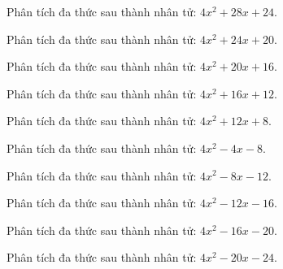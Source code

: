 \begin{bt}
	Phân tích đa thức sau thành nhân tử: $4 x^2 + 28 x + 24$.
\end{bt}
\begin{bt}
	Phân tích đa thức sau thành nhân tử: $4 x^2 + 24 x + 20$.
\end{bt}
\begin{bt}
	Phân tích đa thức sau thành nhân tử: $4 x^2 + 20 x + 16$.
\end{bt}
\begin{bt}
	Phân tích đa thức sau thành nhân tử: $4 x^2 + 16 x + 12$.
\end{bt}
\begin{bt}
	Phân tích đa thức sau thành nhân tử: $4 x^2 + 12 x + 8$.
\end{bt}
\begin{bt}
	Phân tích đa thức sau thành nhân tử: $4 x^2 - 4 x - 8$.
\end{bt}
\begin{bt}
	Phân tích đa thức sau thành nhân tử: $4 x^2 - 8 x - 12$.
\end{bt}
\begin{bt}
	Phân tích đa thức sau thành nhân tử: $4 x^2 - 12 x - 16$.
\end{bt}
\begin{bt}
	Phân tích đa thức sau thành nhân tử: $4 x^2 - 16 x - 20$.
\end{bt}
\begin{bt}
	Phân tích đa thức sau thành nhân tử: $4 x^2 - 20 x - 24$.
\end{bt}
